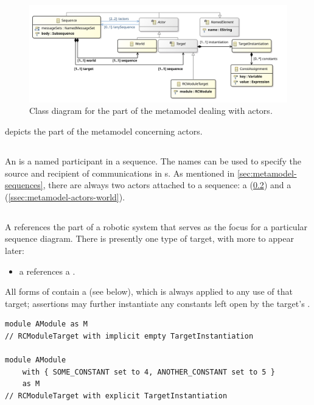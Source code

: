 \begin{figure}
	\centering
	\includegraphics[width=\textwidth]{diagrams/Actors}
	\caption{Class diagram for the part of the \langname{} metamodel dealing with actors.}
	\label{fig:metamodel-actors}
\end{figure}

 depicts the part of the metamodel concerning
actors.

\subsection{\mactor}

An \mactor{} is a named participant in a sequence.  The names can be used to
specify the source and recipient of communications in \mmessagespec{}s.
As mentioned in
\cref{sec:metamodel-sequences}, there are always two actors
attached to a sequence: a \mtarget{} (\cref{ssec:metamodel-actors-target})
and a \mworld{} (\cref{ssec:metamodel-actors-world}).

\subsection{\mtarget}\label{ssec:metamodel-actors-target}

A \mtarget{} references the part of a robotic system that serves as the focus
for a particular sequence diagram.  There is
presently one type of target, with more to appear later:

\begin{itemize}
\item
	a \mrcmoduletarget{} references a \mrcmodule.
\end{itemize}

All forms of \mtarget{} contain a \mtargetinstantiation{} (see below), which
is always applied to any use of that target; assertions may further instantiate
any constants left open by the target's \mtargetinstantiation.

\begin{lstlisting}[style=Example]
module AModule as M
// RCModuleTarget with implicit empty TargetInstantiation

module AModule
    with { SOME_CONSTANT set to 4, ANOTHER_CONSTANT set to 5 }
    as M
// RCModuleTarget with explicit TargetInstantiation
\end{lstlisting}

